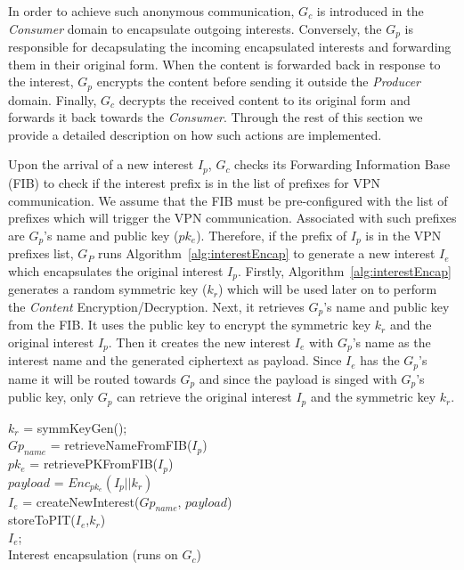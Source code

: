In order to achieve such anonymous communication, $G_c$ is introduced in the \textit{Consumer} domain to encapsulate outgoing interests. Conversely, the $G_p$ is responsible for decapsulating the incoming encapsulated interests and forwarding them in their original form. When the content is forwarded back in response to the interest, $G_p$ encrypts the content before sending it outside the \textit{Producer} domain. Finally, $G_c$ decrypts the received content to its original form and forwards it back towards the \textit{Consumer}. Through the rest of this section we provide a detailed description on how such actions are implemented.

Upon the arrival of a new interest $I_p$, $G_c$ checks its Forwarding Information Base (FIB) to check if the interest prefix is in the list of prefixes for VPN communication. We assume that the FIB must be pre-configured with the list of prefixes which will trigger the VPN communication. Associated with such prefixes are $G_p$'s name and public key ($pk_e$). Therefore, if the prefix of $I_p$ is in the VPN prefixes list, $G_P$ runs Algorithm~\ref{alg:interestEncap} to generate a new interest $I_e$ which encapsulates the original interest $I_p$. Firstly, Algorithm~\ref{alg:interestEncap} generates a random symmetric key ($k_r$) which will be used later on to perform the \textit{Content} Encryption/Decryption. Next, it retrieves $G_p$'s name and public key from the FIB. It uses the public key to encrypt the symmetric key $k_r$ and the original interest $I_p$. Then it creates the new interest $I_e$ with $G_p$'s name as the interest name and the generated ciphertext as payload. Since $I_e$ has  the $G_p$'s name it will be routed towards $G_p$ and since the payload is singed with $G_p$'s public key, only $G_p$ can retrieve the original interest $I_p$ and the symmetric key $k_r$.

\begin{algorithm}\label{alg:interestEncap}
$k_r$ = symmKeyGen();\\
$Gp_{name}$ = retrieveNameFromFIB($I_p$)\\
$pk_e$ = retrievePKFromFIB($I_p$)\\
$payload$ = $Enc_{pk_e}(I_p||k_r)$\\
$I_e$ = createNewInterest($Gp_{name}$, $payload$)\\
storeToPIT($I_e$,$k_r$)\\
\Return $I_e$;\\
\caption{Interest encapsulation (runs on $G_c$)}
\end{algorithm}

